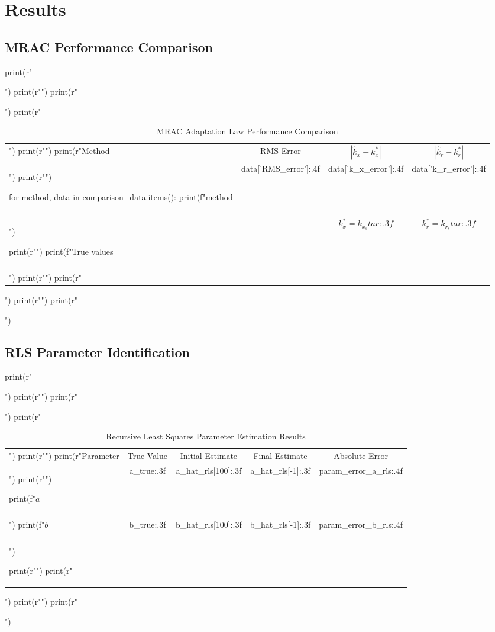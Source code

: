 \documentclass[a4paper, 11pt]{article}
\begin{document}
\section{Results}

\subsection{MRAC Performance Comparison}

\begin{pycode}
print(r"\begin{table}[htbp]")
print(r"\centering")
print(r"\caption{MRAC Adaptation Law Performance Comparison}")
print(r"\begin{tabular}{lccc}")
print(r"\toprule")
print(r"Method & RMS Error & $|\hat{k}_x - k_x^*|$ & $|\hat{k}_r - k_r^*|$ \\")
print(r"\midrule")

for method, data in comparison_data.items():
    print(f"{method} & {data['RMS_error']:.4f} & {data['k_x_error']:.4f} & {data['k_r_error']:.4f} \\\\")

print(r"\midrule")
print(f"True values & --- & $k_x^* = {k_x_star:.3f}$ & $k_r^* = {k_r_star:.3f}$ \\\\")
print(r"\bottomrule")
print(r"\end{tabular}")
print(r"\label{tab:mrac_comparison}")
print(r"\end{table}")
\end{pycode}

\subsection{RLS Parameter Identification}

\begin{pycode}
print(r"\begin{table}[htbp]")
print(r"\centering")
print(r"\caption{Recursive Least Squares Parameter Estimation Results}")
print(r"\begin{tabular}{lcccc}")
print(r"\toprule")
print(r"Parameter & True Value & Initial Estimate & Final Estimate & Absolute Error \\")
print(r"\midrule")

print(f"$a$ & {a_true:.3f} & {a_hat_rls[100]:.3f} & {a_hat_rls[-1]:.3f} & {param_error_a_rls:.4f} \\\\")
print(f"$b$ & {b_true:.3f} & {b_hat_rls[100]:.3f} & {b_hat_rls[-1]:.3f} & {param_error_b_rls:.4f} \\\\")

print(r"\bottomrule")
print(r"\end{tabular}")
print(r"\label{tab:rls_results}")
print(r"\end{table}")
\end{pycode}
\end{document}
